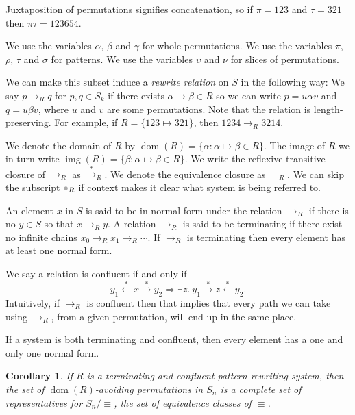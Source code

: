 \documentclass[openany, a4paper, 11pt, english]{article}
\newcommand{\parm}{\mathord{\color{black!33}\bullet}}
\newcommand{\breath}{\vspace{6pt plus 2pt minus 1pt}\noindent}
\newcommand{\patternrule}{ \mapsto \!}
\newtheorem{corollary}[theorem]{Corollary}
\theoremstyle{definition}
\newcommand{\Sym}{S}
\newcommand{\from}{\leftarrow}
\newcommand{\tostar}{\stackrel{*}{\to}}
\newcommand{\fromstar}{\stackrel{*}{\from}}
\DeclareMathOperator{\dom}{dom}
\DeclareMathOperator{\img}{img}
\begin{document}
Juxtaposition of permutations signifies concatenation, so if $\pi=123$ and
$\tau=321$ then $\pi\tau=123654$.

We use the variables $\alpha$, $\beta$ and $\gamma$ for whole permutations.
We use the variables $\pi$, $\rho$, $\tau$ and $\sigma$ for patterns.
We use the variables $\upsilon$ and $\nu$ for slices of permutations.

We can make this subset induce a \emph{rewrite relation} on $\Sym$ in the following way: We say
$p \to_R q$ for $p, q \in \Sym_k$ if there exists $\alpha \patternrule \beta \in R$ so
we can write $p = u \alpha v$ and $q = u \beta v$, where
$u$ and $v$ are some permutations.  Note that the relation is
length-preserving. For example, if $R = \{123 \patternrule 321\}$, then $1234 \to_R 3214$. 

\breath We denote the domain of $R$ by $\dom(R) = \{\alpha : \alpha \patternrule
\beta \in R\}$. The image of $R$ we in turn write $\img(R) = \{\beta : \alpha
\patternrule \beta \in R\}$. We write the reflexive transitive closure of
$\to_R$ as $\tostar_R$.  We denote the equivalence closure as $\equiv_R$. We can
skip the subscript $\parm_R$ if context makes it clear what system is being
referred to.

An element $x$ in $\Sym$ is said to be in normal form under the relation $\to_R$
if there is no $y \in \Sym$ so that $x \to_R y$. A relation $\to_R$ is said to be
terminating if there exist no infinite chains $x_0 \to_R x_1 \to_R \cdots$. If
$\to_R$ is terminating then every element has at least one normal form. 

We say a relation is confluent if and only if
$$
    y_1 \fromstar x \tostar y_2 \Longrightarrow 
    \exists z. \  y_1 \tostar z \fromstar y_2.
$$
Intuitively, if $\to_R$ is confluent then that implies that every path we can
take using $\to_R$, from a given permutation, will end up in the same place. 

If a system is both terminating and confluent, then every element has a one and
only one normal form.

\begin{corollary}
    If $R$ is a terminating and confluent pattern-rewriting system, then the set
    of $\dom(R)$-avoiding permutations in $S_n$ is a complete set of
    representatives for $S_n / \equiv$, the set of equivalence classes of
    $\equiv$.
\end{corollary}
\end{document}
